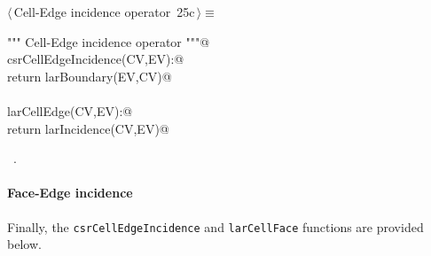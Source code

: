 \documentclass[11pt,oneside]{article}    %
\begin{document}
\begin{flushleft} \small \label{scrap41}
\protect{}$\langle\,$Cell-Edge incidence operator\nobreak\ {\footnotesize 25c}$\,\rangle\equiv$
\vspace{-1ex}
\begin{list}{}{} \item
\mbox{}\verb@""" Cell-Edge incidence operator """@\\
\mbox{}\verb@def csrCellEdgeIncidence(CV,EV):@\\
\mbox{}\verb@     return larBoundary(EV,CV)@\\
\mbox{}\verb@@\\
\mbox{}\verb@def larCellEdge(CV,EV):@\\
\mbox{}\verb@    return larIncidence(CV,EV)@\\
\mbox{}\verb@@{\NWsep}
\end{list}
\vspace{-1ex}
\footnotesize\addtolength{\baselineskip}{-1ex}
\begin{list}{}{\setlength{\itemsep}{-\parsep}\setlength{\itemindent}{-\leftmargin}}
\item \NWtxtMacroRefIn\ .
\end{list}
\end{flushleft}

\paragraph{Face-Edge incidence}
Finally, the \texttt{csrCellEdgeIncidence} and \texttt{larCellFace} functions are provided below.
\end{document}
